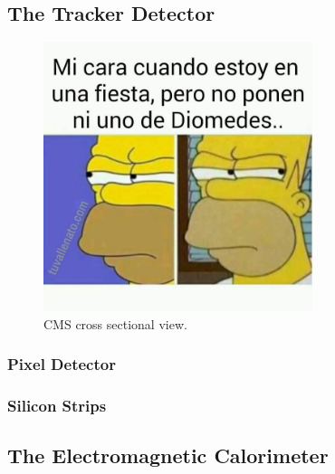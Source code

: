 \subsection{The Tracker Detector}


\begin{figure}[!h]
  \centering
  \includegraphics[width=0.7\textwidth]{../images/ch2/4}
  \caption[CMS cross sectional view]{CMS cross sectional view.}\label{fig:cms_layout}
\end{figure}


\subsubsection{Pixel Detector}





\subsubsection{Silicon Strips}




\subsection{The Electromagnetic Calorimeter}


